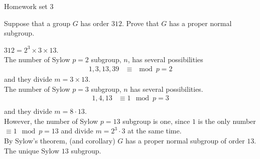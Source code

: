 \documentclass{article}
\begin{document}
\maketitle
Homework set 3

\pagebreak

\begin{homeworkProblem}
    Suppose that a group $G$ has order $312$. 
    Prove that $G$ has a proper normal subgroup.\\
    \solution

    $312 = 2^3 \times 3 \times 13$.\\
    The number of Sylow $p=2$ subgroup, $n$, has several possibilities 
    \begin{align}
        1,3,13,39 &\equiv \mod p=2
    \end{align}
    and they divide $m = 3 \times 13$.\\
    The number of Sylow $p = 3$ subgroup, $n$ has several possibilities.
    \begin{align}
        1,4,13 &\equiv 1 \mod p=3\\
    \end{align}
    and they divide $m = 8 \cdot 13$.\\
    However, the number of Sylow $p=13$ subgroup
    is one, since $1$ is the only number $\equiv 1 \mod p=13$
    and divide $m = 2^3 \cdot 3$ at the same time.\\
    By Sylow's theorem, (and corollary)
    $G$ has a proper normal subgroup of order $13$.\\
    The unique Sylow $13$ subgroup.\\




\end{homeworkProblem}

\pagebreak
\end{document}
